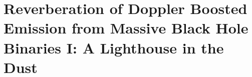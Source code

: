 \chapter[A Lighthouse in the Dust]{Reverberation of Doppler Boosted Emission from Massive Black Hole Binaries I: A Lighthouse in the Dust}
\label{ch:Dust}
\let\thefootnote\relax{}








        







